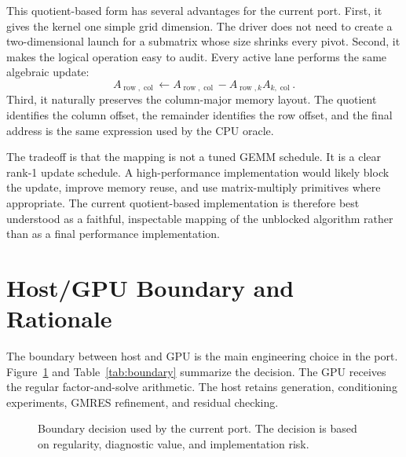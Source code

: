 \documentclass[11pt]{article}
\begin{document}
This quotient-based form has several advantages for the current port.
First, it gives the kernel one simple grid dimension. The driver does not need
to create a two-dimensional launch for a submatrix whose size shrinks every
pivot. Second, it makes the logical operation easy to audit. Every active lane
performs the same algebraic update:
\[
  A_{\operatorname{row},\operatorname{col}}
  \leftarrow
  A_{\operatorname{row},\operatorname{col}}
  - A_{\operatorname{row},k} A_{k,\operatorname{col}}.
\]
Third, it naturally preserves the column-major memory layout. The quotient
identifies the column offset, the remainder identifies the row offset, and the
final address is the same expression used by the CPU oracle.

The tradeoff is that the mapping is not a tuned GEMM schedule. It is a clear
rank-1 update schedule. A high-performance implementation would likely block
the update, improve memory reuse, and use matrix-multiply primitives where
appropriate. The current quotient-based implementation is therefore best
understood as a faithful, inspectable mapping of the unblocked algorithm rather
than as a final performance implementation.

\section{Host/GPU Boundary and Rationale}

The boundary between host and GPU is the main engineering choice in the port.
Figure~\ref{fig:boundary} and Table~\ref{tab:boundary} summarize the decision.
The GPU receives the regular factor-and-solve arithmetic. The host retains
generation, conditioning experiments, GMRES refinement, and residual checking.

\begin{figure}[htbp]
\centering
{}
\caption{Boundary decision used by the current port. The decision is based on regularity, diagnostic value, and implementation risk.}
\label{fig:boundary}
\end{figure}
\end{document}
